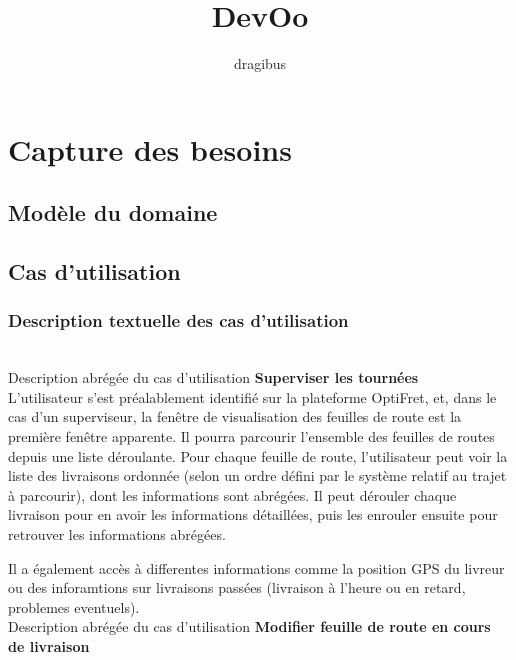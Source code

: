 \documentclass[a4paper]{report}
\begin{document}
\title{DevOo}
\author{dragibus}

\maketitle

\tableofcontents


\chapter{Capture des besoins}

\section{Modèle du domaine}

\section{Cas d'utilisation}

\subsection{Description textuelle des cas d'utilisation}
~~\\

Description abrégée du cas d’utilisation \textbf{Superviser les tournées}\\

L’utilisateur s’est préalablement identifié sur la plateforme OptiFret, et,
dans le cas d’un superviseur, la fenêtre de visualisation des feuilles de
route est la première fenêtre apparente. Il pourra parcourir l’ensemble des
feuilles de routes depuis une liste déroulante. Pour chaque feuille de route,
l’utilisateur peut voir la liste des livraisons ordonnée (selon un ordre
défini par le système relatif au trajet à parcourir), dont les informations
sont abrégées. Il peut dérouler chaque livraison pour en avoir les
informations détaillées, puis les enrouler ensuite pour retrouver les
informations abrégées.

Il a également accès à differentes informations comme la position GPS du
livreur ou des inforamtions sur livraisons passées (livraison à l’heure ou en
retard, problemes eventuels). \\


Description abrégée du cas d’utilisation \textbf{Modifier feuille de route en
cours de livraison}\\
\end{document}
